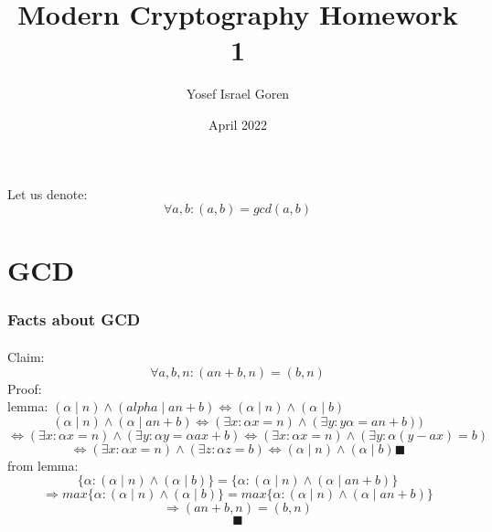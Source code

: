 \documentclass{article}
\title{Modern Cryptography Homework 1}
\author{Yosef Israel Goren}
\date{April 2022}
\begin{document}
\maketitle

Let us denote:
\[\forall a, b: (a,b) = gcd(a,b)\]

\part*{GCD}
\section{Facts about GCD}
\subsection{}
Claim:
\[
	\forall a,b,n: (an+b, n) = (b, n)
\]
Proof:\\
lemma: $(\alpha\mid n)\wedge(alpha\mid an+b)\Leftrightarrow(\alpha\mid n)\wedge(\alpha\mid b)$
\[
	(\alpha \mid  n)\wedge (\alpha \mid  an+b)
	\Leftrightarrow (\exists x: \alpha x= n)\wedge (\exists y:y\alpha =an+b))
\]
\[
	\Leftrightarrow (\exists x: \alpha x= n)\wedge (\exists y: \alpha y = \alpha ax+b)
	\Leftrightarrow (\exists x: \alpha x= n)\wedge (\exists y: \alpha(y-ax) = b)
\]
\[
	\Leftrightarrow (\exists x: \alpha x= n)\wedge (\exists z: \alpha z=b)
	\Leftrightarrow (\alpha \mid n)\wedge (\alpha\mid b)\blacksquare
\]
from lemma:
\[
	\{\alpha: (\alpha\mid n) \wedge (\alpha\mid b)\}
	=\{\alpha: (\alpha\mid n) \wedge (\alpha\mid an+b)\}
\]
\[
	\Rightarrow
	max\{\alpha: (\alpha\mid n) \wedge (\alpha\mid b)\}
	=max\{\alpha: (\alpha\mid n) \wedge (\alpha\mid an+b)\}
\]
\[
	\Rightarrow
	(an+b, n)=(b, n)
\]
\[\blacksquare\]
\end{document}
